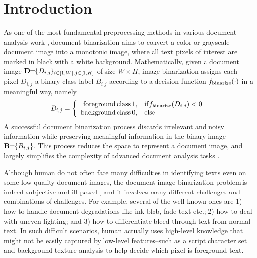 \documentclass[onecolumn,11pt,draftcls,journal]{IEEEtran}
\def \dibp{the document image binarization problem\,}
\newcommand{\im}[1]{{\bf{#1}}}
\begin{document}
\IEEEpeerreviewmaketitle
\section{Introduction}
%
% 
%
%
% 
%
As one of the most fundamental preprocessing methods in various document analysis work \cite{DIBCO2009,DIBCO2010,DIBCO2011,DIBCO2012,DIBCO2013,DIBCO2014, Su2013, Combined2014, Howe2013,6065466}, document binarization aims to convert a color or grayscale document image into a monotonic image, where all text pixels of interest are marked in black with a white background. Mathematically, given a document image $\im{D}\!\!=\!\!\{D_{i,j}\}_{i\in[1,W], j\in[1,H]}$ of size $W\!\!\times\!\!H$, image binarization assigns each pixel $D_{i,j}$ a binary class label $B_{i,j}$ according to a decision function $f_{\rm{binarize}}(\cdot)$ in a meaningful way, namely
\begin{equation}
B_{i,j}=\left\{
\begin{array}{r@{}cl}
{\rm{foreground\,class\,}} 1 ,&&{\rm{if}}f_{\rm{binarize}}(D_{i,j}) < 0\\
{ \rm{background\,class\,}} 0 ,&&{\rm{else}} 
\end{array}
\right.
\label{eq.bin}
\end{equation}
A successful document binarization process discards irrelevant and noisy information while preserving meaningful information in the binary image $\im{B}\!\!=\!\!\{B_{i,j}\}$. This process reduces the space to represent a document image, and largely simplifies the complexity of advanced document analysis tasks \cite{Howe2011}.

Although human do not often face many difficulties in identifying texts even on some low-quality document images,  \dibp is indeed subjective and ill-posed \cite{Howe2011}, and it involves many different challenges and combinations of challenges. For example, several of the well-known ones are 1) how to handle document degradations like ink blob, fade text etc.; 2) how to deal with uneven lighting; and 3) how to differentiate bleed-through text from normal text. In such difficult scenarios, human actually uses high-level knowledge that might not be easily captured by low-level features--such as a script character set and background texture analysis--to help decide which pixel is foreground text. 
\end{document}
